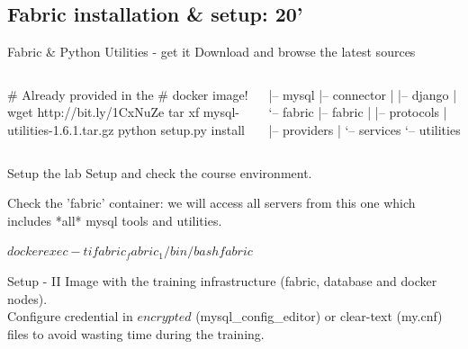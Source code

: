 \documentclass{beamer}[10]
\begin{document}
\subsection{Fabric installation \& setup: 20'}
\begin{pyframe}{Fabric \& Python Utilities - get it}
Download and browse the latest sources
\begin{columns}[t]
    \begin{bashcode}
    # Already provided in the
    #  docker image!
    wget http://bit.ly/1CxNuZe
    tar xf mysql-utilities-1.6.1.tar.gz
    python setup.py install
    \end{bashcode}
\begin{bashcode}
   |-- mysql
   |-- connector
   |   |-- django
   |   `-- fabric
   |-- fabric
   |   |-- protocols
   |   |-- providers
   |   `-- services
   `-- utilities
\end{bashcode}
\end{columns}

\end{pyframe}

\begin{pyframe}{Setup the lab}
Setup and check the course environment.

Check the 'fabric' container: we will access all servers from this
 one which includes *all* mysql tools and utilities.
\begin{bashcode}
$ docker exec -ti fabric_fabric_1 /bin/bash
fabric$
\end{bashcode}
\end{pyframe}


\begin{pyframe}{Setup - II}
Image with the training infrastructure (fabric, database and docker nodes).
\\
Configure credential in $encrypted$ (mysql\_config\_editor)
 or clear-text (my.cnf) files to avoid wasting time during
the training.
 \\
\end{pyframe}
\end{document}
